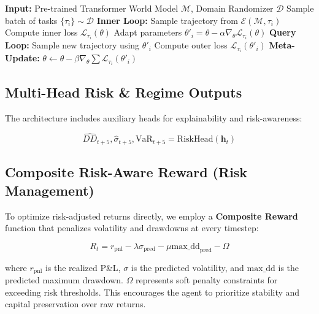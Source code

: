 \documentclass[11pt]{article}
\begin{document}
\begin{algorithm}[h]
\caption{Meta-RL Training (MAML + Recurrent PPO)}
\begin{algorithmic}
\STATE \textbf{Input:} Pre-trained Transformer World Model $\mathcal{M}$, Domain Randomizer $\mathcal{D}$
    \STATE Sample batch of tasks $\{\tau_i\} \sim \mathcal{D}$
        \STATE \textbf{Inner Loop:} Sample trajectory from $\mathcal{E}(\mathcal{M}, \tau_i)$
        \STATE Compute inner loss $\mathcal{L}_{\tau_i}(\theta)$
        \STATE Adapt parameters $\theta'_i = \theta - \alpha \nabla_\theta \mathcal{L}_{\tau_i}(\theta)$
        \STATE \textbf{Query Loop:} Sample new trajectory using $\theta'_i$
        \STATE Compute outer loss $\mathcal{L}_{\tau_i}(\theta'_i)$
    \ENDFOR
    \STATE \textbf{Meta-Update:} $\theta \gets \theta - \beta \nabla_\theta \sum \mathcal{L}_{\tau_i}(\theta'_i)$
\ENDFOR
\end{algorithmic}
\end{algorithm}

\subsection{Multi-Head Risk \& Regime Outputs}

The architecture includes auxiliary heads for explainability and risk-awareness:

\begin{equation}
    \hat{DD}_{t+5}, \hat{\sigma}_{t+5}, \text{VaR}_{t+5} = \text{RiskHead}(\mathbf{h}_t)
\end{equation}

\subsection{Composite Risk-Aware Reward (Risk Management)}

To optimize risk-adjusted returns directly, we employ a \textbf{Composite Reward} function that penalizes volatility and drawdowns at every timestep:

\begin{equation}
    R_t = r_{\text{pnl}} - \lambda \sigma_{\text{pred}} - \mu \text{max\_dd}_{\text{pred}} - \Omega
\end{equation}

where $r_{\text{pnl}}$ is the realized P\&L, $\sigma$ is the predicted volatility, and $\text{max\_dd}$ is the predicted maximum drawdown. $\Omega$ represents soft penalty constraints for exceeding risk thresholds. This encourages the agent to prioritize stability and capital preservation over raw returns.
\end{document}
